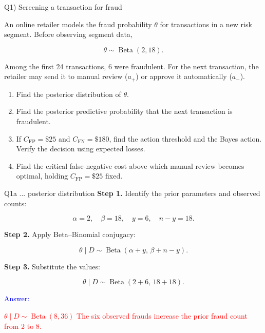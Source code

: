 \documentclass[aspectratio=43,10pt]{beamer}
\newcommand{\CFP}{C_{\mathrm{FP}}}
\newcommand{\CFN}{C_{\mathrm{FN}}}
\newcommand{\answer}[1]{\textcolor{red}{#1}}
\begin{document}
\begin{frame}{Q1) Screening a transaction for fraud}

  An online retailer models the fraud probability $\theta$ for
  transactions in a new risk segment. Before observing segment data,

  \[
  \theta\sim\operatorname{Beta}(2,18).
  \]

  Among the first 24 transactions, 6 were fraudulent. For the next
  transaction, the retailer may send it to manual review ($a_+$) or
  approve it automatically ($a_-$).

  \vspace{0.15cm}

  \begin{enumerate}
    \item[a.] Find the posterior distribution of $\theta$.

    \item[b.] Find the posterior predictive probability that the next
          transaction is fraudulent.

    \item[c.] If $\CFP=\$25$ and $\CFN=\$180$, find the action threshold
          and the Bayes action. Verify the decision using expected losses.

    \item[d.] Find the critical false-negative cost above which manual review
          becomes optimal, holding $\CFP=\$25$ fixed.
  \end{enumerate}

\end{frame}


\begin{frame}{}
\begin{block}{Q1a ... posterior distribution}
  \textbf{Step 1.} Identify the prior parameters and observed counts:

  \[
  \alpha=2,\quad \beta=18,\quad y=6,\quad n-y=18.
  \]
  
  \pause

  \textbf{Step 2.} Apply Beta--Binomial conjugacy:

  \[
  \theta\mid D\sim
  \operatorname{Beta}(\alpha+y,\,\beta+n-y).
  \]

  \pause
  
  \textbf{Step 3.} Substitute the values:

  \[
  \theta\mid D\sim
  \operatorname{Beta}(2+6,\,18+18).
  \]

  \textcolor{blue}{Answer:}

  \answer{
    $\theta \mid D\sim\operatorname{Beta}(8,36)$
    The six observed frauds increase the prior fraud count from 2 to 8.
  }
\end{block}
\end{frame}
\end{document}
